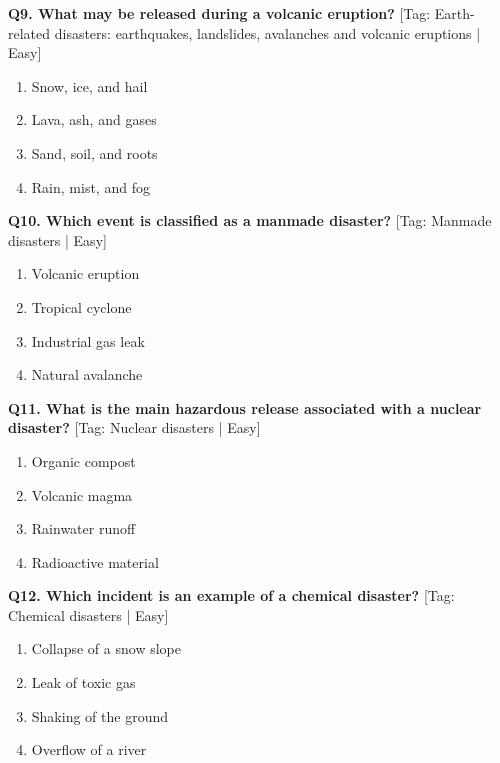 \noindent\textbf{Q9. What may be released during a volcanic eruption?} \hfill [Tag: Earth-related disasters: earthquakes, landslides, avalanches and volcanic eruptions | Easy]
\begin{enumerate}[label=(\alph*),topsep=2pt,itemsep=1pt,partopsep=0pt,parsep=0pt]
    \item {Snow, ice, and hail}
    \item {Lava, ash, and gases}
    \item {Sand, soil, and roots}
    \item {Rain, mist, and fog}
\end{enumerate}
\vspace{2mm}

\noindent\textbf{Q10. Which event is classified as a manmade disaster?} \hfill [Tag: Manmade disasters | Easy]
\begin{enumerate}[label=(\alph*),topsep=2pt,itemsep=1pt,partopsep=0pt,parsep=0pt]
    \item {Volcanic eruption}
    \item {Tropical cyclone}
    \item {Industrial gas leak}
    \item {Natural avalanche}
\end{enumerate}
\vspace{2mm}

\noindent\textbf{Q11. What is the main hazardous release associated with a nuclear disaster?} \hfill [Tag: Nuclear disasters | Easy]
\begin{enumerate}[label=(\alph*),topsep=2pt,itemsep=1pt,partopsep=0pt,parsep=0pt]
    \item {Organic compost}
    \item {Volcanic magma}
    \item {Rainwater runoff}
    \item {Radioactive material}
\end{enumerate}
\vspace{2mm}

\noindent\textbf{Q12. Which incident is an example of a chemical disaster?} \hfill [Tag: Chemical disasters | Easy]
\begin{enumerate}[label=(\alph*),topsep=2pt,itemsep=1pt,partopsep=0pt,parsep=0pt]
    \item {Collapse of a snow slope}
    \item {Leak of toxic gas}
    \item {Shaking of the ground}
    \item {Overflow of a river}
\end{enumerate}
\vspace{2mm}

